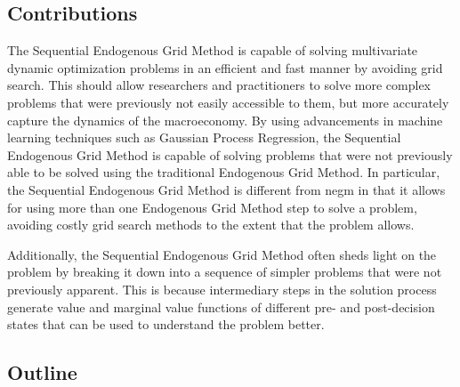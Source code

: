 \documentclass{article}
\begin{document}
\subsection{Contributions}



The Sequential Endogenous Grid Method is capable of solving multivariate dynamic optimization problems in an efficient and fast manner by avoiding grid search. This should allow researchers and practitioners to solve more complex problems that were previously not easily accessible to them, but more accurately capture the dynamics of the macroeconomy. By using advancements in machine learning techniques such as Gaussian Process Regression, the Sequential Endogenous Grid Method is capable of solving problems that were not previously able to be solved using the traditional Endogenous Grid Method. In particular, the Sequential Endogenous Grid Method is different from \acrshort{negm} in that it allows for using more than one Endogenous Grid Method step to solve a problem, avoiding costly grid search methods to the extent that the problem allows.

Additionally, the Sequential Endogenous Grid Method often sheds light on the problem by breaking it down into a sequence of simpler problems that were not previously apparent. This is because intermediary steps in the solution process generate value and marginal value functions of different pre- and post-decision states that can be used to understand the problem better.


\subsection{Outline}

\end{document}
